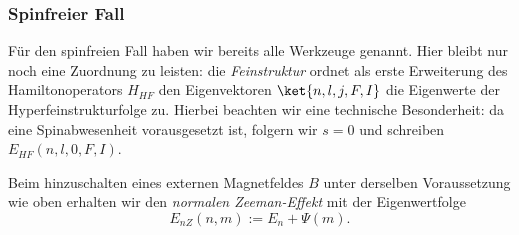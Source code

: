 \documentclass{subfiles}
\begin{document}
        \subsubsection*{Spinfreier Fall}
            Für den spinfreien Fall haben wir bereits alle Werkzeuge genannt. Hier bleibt nur noch eine Zuordnung zu leisten: die \emph{Feinstruktur} ordnet als erste Erweiterung des Hamiltonoperators $H_{HF}$ den Eigenvektoren $\ket{n,l,j,F,I}$ die Eigenwerte der Hyperfeinstrukturfolge zu. Hierbei beachten wir eine technische Besonderheit: da eine Spinabwesenheit vorausgesetzt ist, folgern wir $s = 0$ und schreiben $E_\textit{HF}(n,l,0,F,I)$. 

            Beim hinzuschalten eines externen Magnetfeldes $B$ unter derselben Voraussetzung wie oben erhalten wir den \emph{normalen Zeeman-Effekt} mit der Eigenwertfolge
            \[
                E_\textit{nZ}(n,m) := E_n + \Psi(m). 
            \]
\end{document}
